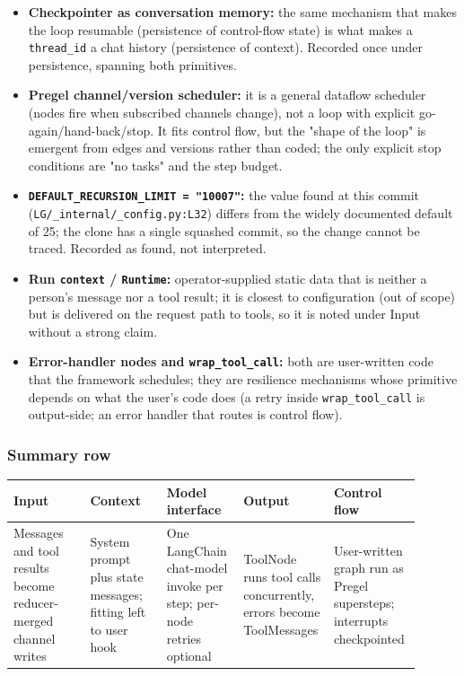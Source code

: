 \begin{itemize}
\item \textbf{Checkpointer as conversation memory:} the same mechanism that makes the loop resumable (persistence of control-flow state) is what makes a \texttt{thread\_\allowbreak{}id} a chat history (persistence of context). Recorded once under persistence, spanning both primitives.
\item \textbf{Pregel channel/version scheduler:} it is a general dataflow scheduler (nodes fire when subscribed channels change), not a loop with explicit go-again/hand-back/stop. It fits control flow, but the "shape of the loop" is emergent from edges and versions rather than coded; the only explicit stop conditions are "no tasks" and the step budget.
\item \textbf{\texttt{DEFAULT\_\allowbreak{}RECURSION\_\allowbreak{}LIMIT = "10007"}:} the value found at this commit (\texttt{LG/\allowbreak{}\_\allowbreak{}internal/\allowbreak{}\_\allowbreak{}config.\allowbreak{}py:\allowbreak{}L32}) differs from the widely documented default of 25; the clone has a single squashed commit, so the change cannot be traced. Recorded as found, not interpreted.
\item \textbf{Run \texttt{context} / \texttt{Runtime}:} operator-supplied static data that is neither a person's message nor a tool result; it is closest to configuration (out of scope) but is delivered on the request path to tools, so it is noted under Input without a strong claim.
\item \textbf{Error-handler nodes and \texttt{wrap\_\allowbreak{}tool\_\allowbreak{}call}:} both are user-written code that the framework schedules; they are resilience mechanisms whose primitive depends on what the user's code does (a retry inside \texttt{wrap\_\allowbreak{}tool\_\allowbreak{}call} is output-side; an error handler that routes is control flow).
\end{itemize}

\subsubsection*{Summary row}
\begin{longtable}{@{}p{0.18\linewidth}p{0.18\linewidth}p{0.18\linewidth}p{0.18\linewidth}p{0.18\linewidth}@{}}
\toprule \textbf{Input} & \textbf{Context} & \textbf{Model interface} & \textbf{Output} & \textbf{Control flow} \\ \midrule \endhead
Messages and tool results become reducer-merged channel writes & System prompt plus state messages; fitting left to user hook & One LangChain chat-model invoke per step; per-node retries optional & ToolNode runs tool calls concurrently, errors become ToolMessages & User-written graph run as Pregel supersteps; interrupts checkpointed \\
\bottomrule \end{longtable}


